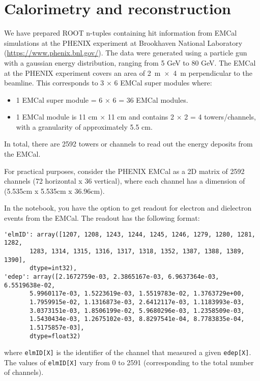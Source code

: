 \documentclass[a4paper,12pt]{article}
\begin{document}
\section{Calorimetry and reconstruction}

We have prepared ROOT n-tuples containing hit information from EMCal simulations at the PHENIX experiment at Brookhaven National Laboratory (\url{https://www.phenix.bnl.gov/}).
The data were generated using a particle gun with a gaussian energy distribution, ranging from 5 GeV to 80 GeV.
The EMCal at the PHENIX experiment covers an area of 2~m~×~4~m perpendicular to the beamline. 
This corresponds to 3 × 6 EMCal super modules where:
\begin{itemize}
    \item 1 EMCal super module = 6 × 6 = 36 EMCal modules.
    \item 1 EMCal module is 11 cm × 11 cm and contains 2 × 2 = 4 towers/channels, with a granularity of approximately 5.5 cm.
\end{itemize}
In total, there are 2592 towers or channels to read out the energy deposits from the EMCal.

For practical purposes, consider the PHENIX EMCal as a 2D matrix of 2592 channels (72 horizontal x 36 vertical), where each channel has a dimension of (5.535cm x 5.535cm x 36.96cm).

In the notebook, you have the option to get readout for electron and dielectron events from the EMCal.
The readout has the following format:
\begin{verbatim}
'elmID': array([1207, 1208, 1243, 1244, 1245, 1246, 1279, 1280, 1281, 1282,
       1283, 1314, 1315, 1316, 1317, 1318, 1352, 1387, 1388, 1389, 1390],
       dtype=int32), 
'edep': array([2.1672759e-03, 2.3865167e-03, 6.9637364e-03, 6.5519638e-02,
       5.9960117e-03, 1.5223619e-03, 1.5519783e-02, 1.3763729e+00,
       1.7959915e-02, 1.1316873e-03, 2.6412117e-03, 1.1183993e-03,
       3.0373151e-03, 1.8506199e-02, 5.9680296e-03, 1.2358509e-03,
       1.5430434e-03, 1.2675102e-03, 8.8297541e-04, 8.7783835e-04,
       1.5175857e-03],
       dtype=float32)
\end{verbatim}
where {\tt elmID[X]} is the identifier of the channel that measured a given {\tt edep[X]}.
The values of {\tt elmID[X]} vary from 0 to 2591 (corresponding to the total number of channels).
\end{document}
